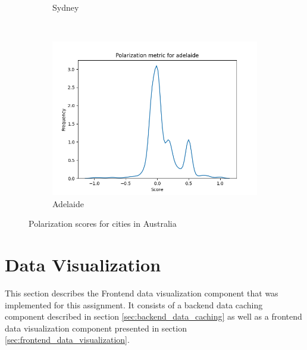 \documentclass[11pt, oneside]{article}
\begin{document}
\begin{figure}[h!]
\begin{subfigure}[b]{0.3\textwidth}
        \caption{Sydney}
    \end{subfigure}
    ~ %
    \begin{subfigure}[b]{0.3\textwidth}
        \includegraphics[width=\textwidth]{figures/polarization_adelaide.png}
        \caption{Adelaide}
    \end{subfigure}
    \caption{Polarization scores for cities in Australia}
    \label{fig:sentiment}
\end{figure}
\newline

\section{Data Visualization}
\label{sec:web_frontend}
This section describes the Frontend data visualization component that was implemented for this assignment. It consists of a backend data caching component described in section \ref{sec:backend_data_caching} as well as a frontend data visualization component presented in section \ref{sec:frontend_data_visualization}.
\end{document}
